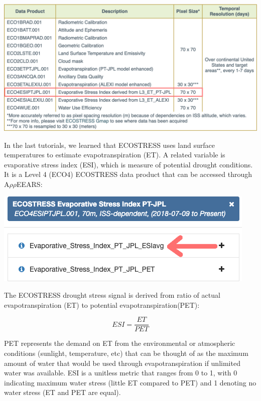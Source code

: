 \documentclass[oneside,a4paper,11pt,explicit]{book}
\begin{document}
\vspace{.5em}

\centerline{\includegraphics[width=.75\textwidth]{ECOSTRESS_DataProducts.png}}

\vspace{.5em}

In the last tutorials, we learned that ECOSTRESS uses land surface temperatures to estimate evapotranspiration (ET). A related variable is evaporative stress index (ESI), which is measure of potential drought conditions. It is a Level 4 (ECO4) ECOSTRESS data product that can be accessed through A$\rho\rho$EEARS:

\vspace{.5em}

\centerline{\includegraphics[width=.6\textwidth]{ESIecostress.png}}

\vspace{.5em}

The ECOSTRESS drought stress signal is derived from ratio of actual evapotranspiration (ET) to potential evapotranspiration(PET):

\[
	ESI = \frac{ET}{PET}
\]

PET represents the demand on ET from the environmental or atmospheric conditions (sunlight, temperature, etc) that can be thought of as the maximum amount of water that would be used through evapotranspiration if unlimited water was available. ESI is a unitless metric that ranges from 0 to 1, with 0 indicating maximum water stress (little ET compared to PET) and 1 denoting no water stress (ET and PET are equal). 

\end{document}
